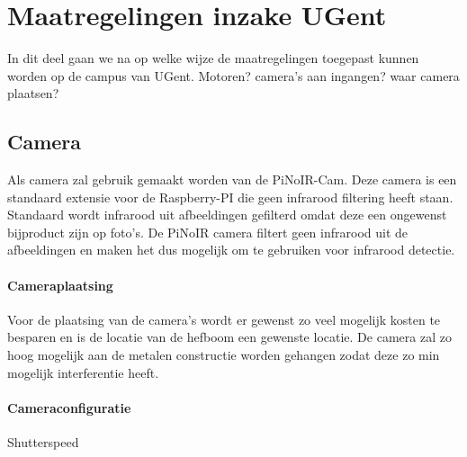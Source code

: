 \section{Maatregelingen inzake UGent}
In dit deel gaan we na op welke wijze de maatregelingen toegepast kunnen worden op de campus van UGent.  
Motoren?
camera's aan ingangen?
waar camera plaatsen?

\subsection{Camera}
Als camera zal gebruik gemaakt worden van de PiNoIR-Cam. Deze camera is een standaard extensie voor de Raspberry-PI die geen infrarood filtering heeft staan. Standaard wordt infrarood uit afbeeldingen gefilterd omdat deze een ongewenst bijproduct zijn op foto's. De PiNoIR camera filtert geen infrarood uit de afbeeldingen en maken het dus mogelijk om te gebruiken voor infrarood detectie.

\paragraph{Cameraplaatsing}
Voor de plaatsing van de camera's wordt er gewenst zo veel mogelijk kosten te besparen en is de locatie van de hefboom een gewenste locatie. De camera zal zo hoog mogelijk aan de metalen constructie worden gehangen zodat deze zo min mogelijk interferentie heeft.

\paragraph{Cameraconfiguratie}
Shutterspeed